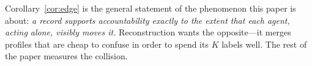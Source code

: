 Corollary~\ref{cor:edge} is the general statement of the phenomenon this paper is
about: \emph{a record supports accountability exactly to the extent that each
agent, acting alone, visibly moves it.} Reconstruction wants the opposite---it
merges profiles that are cheap to confuse in order to spend its $K$ labels well.
The rest of the paper measures the collision.
